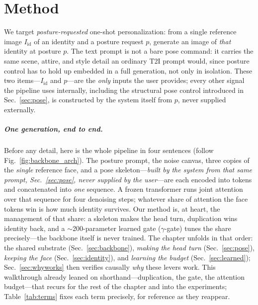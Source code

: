 \chapter{Method}
\label{sec:method}

We target \emph{posture-requested} one-shot personalization: from a single reference image $I_{\mathrm{id}}$ of an identity and a posture request $p$, generate an image of \emph{that} identity at posture $p$. The text prompt is not a bare pose command: it carries the same scene, attire, and style detail an ordinary T2I prompt would, since posture control has to hold up embedded in a full generation, not only in isolation. These two items---$I_{\mathrm{id}}$ and $p$---are the \emph{only} inputs the user provides; every other signal the pipeline uses internally, including the structural pose control introduced in Sec.~\ref{sec:pose}, is constructed by the system itself from $p$, never supplied externally.

\paragraph{One generation, end to end.} Before any detail, here is the whole pipeline in four sentences (follow Fig.~\ref{fig:backbone_arch}). The posture prompt, the noise canvas, three copies of the \emph{single} reference face, and a pose skeleton---\emph{built by the system from that same prompt, Sec.~\ref{sec:pose}, never supplied by the user}---are each encoded into tokens and concatenated into \emph{one} sequence. A frozen transformer runs joint attention over that sequence for four denoising steps; whatever share of attention the face tokens win is how much identity survives. Our method is, at heart, the management of that share: a skeleton makes the head turn, duplication wins identity back, and a $\sim$200-parameter learned gate ($\gamma$-gate) tunes the share precisely---the backbone itself is never trained. The chapter unfolds in that order: the shared substrate (Sec.~\ref{sec:backbone}), \emph{making the head turn} (Sec.~\ref{sec:pose}), \emph{keeping the face} (Sec.~\ref{sec:identity}), and \emph{learning the budget} (Sec.~\ref{sec:learned}); Sec.~\ref{sec:whyworks} then verifies causally \emph{why} these levers work. This walkthrough already
leaned on shorthand---duplication, the gate, the attention budget---that
recurs for the rest of the chapter and into the experiments; Table~\ref{tab:terms}
fixes each term precisely, for reference as they reappear.

